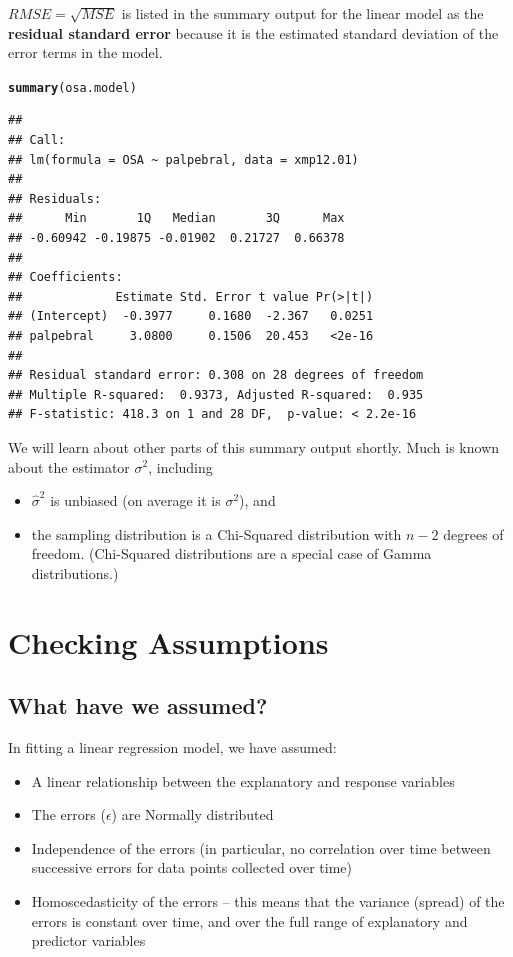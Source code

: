 \documentclass[twoside]{book}\usepackage[]{graphicx}\usepackage[]{xcolor}
\makeatletter
\newcommand{\hlstd}[1]{\textcolor[rgb]{0.345,0.345,0.345}{#1}}%
\newcommand{\hlkwd}[1]{\textcolor[rgb]{0.737,0.353,0.396}{\textbf{#1}}}%
\newenvironment{kframe}{%
 \def\at@end@of@kframe{}%
 \ifinner\ifhmode%
  \def\at@end@of@kframe{\end{minipage}}%
  \begin{minipage}{\columnwidth}%
 \fi\fi%
 \def\FrameCommand##1{\hskip\@totalleftmargin \hskip-\fboxsep
 \colorbox{shadecolor}{##1}\hskip-\fboxsep
     \hskip-\linewidth \hskip-\@totalleftmargin \hskip\columnwidth}%
 \MakeFramed {\advance\hsize-\width
   \@totalleftmargin\z@ \linewidth\hsize
   \@setminipage}}%
 {\par\unskip\endMakeFramed%
 \at@end@of@kframe}
\newenvironment{knitrout}{}{} %
\def\term#1{\textbf{#1}}
\makeatother
\begin{document}
$RMSE = \sqrt{MSE}$ is listed in the summary output for the linear model as the
\term{residual standard error} because it is the estimated standard deviation of 
the error terms in the model.
\begin{knitrout}
\color{fgcolor}\begin{kframe}
\begin{alltt}
\hlkwd{summary}\hlstd{(osa.model)}
\end{alltt}
\begin{verbatim}
## 
## Call:
## lm(formula = OSA ~ palpebral, data = xmp12.01)
## 
## Residuals:
##      Min       1Q   Median       3Q      Max 
## -0.60942 -0.19875 -0.01902  0.21727  0.66378 
## 
## Coefficients:
##             Estimate Std. Error t value Pr(>|t|)
## (Intercept)  -0.3977     0.1680  -2.367   0.0251
## palpebral     3.0800     0.1506  20.453   <2e-16
## 
## Residual standard error: 0.308 on 28 degrees of freedom
## Multiple R-squared:  0.9373,	Adjusted R-squared:  0.935 
## F-statistic: 418.3 on 1 and 28 DF,  p-value: < 2.2e-16
\end{verbatim}
\end{kframe}
\end{knitrout}
We will learn about other parts of this summary output shortly.
Much is known about the estimator $\sigma^2$, including 
\begin{itemize}
	\item $\hat \sigma^2$ is unbiased (on average it is $\sigma^2$), and 
	\item
		the sampling distribution is a Chi-Squared distribution with
		$n-2$ degrees of freedom.  
		(Chi-Squared distributions are a special case of Gamma distributions.)
\end{itemize}


\section{Checking Assumptions}
\subsection{What have we assumed?}
In fitting a linear regression model, we have assumed:
\begin{itemize}
\item A linear relationship between the explanatory and response variables
\item The errors ($\epsilon$) are Normally distributed
\item Independence of the errors (in particular, no correlation over time between successive errors for data points collected over time)
\item Homoscedasticity of the errors -- this means that the variance (spread) of the errors is constant over time, and over the full range of explanatory and predictor variables
\end{itemize}
\end{document}
